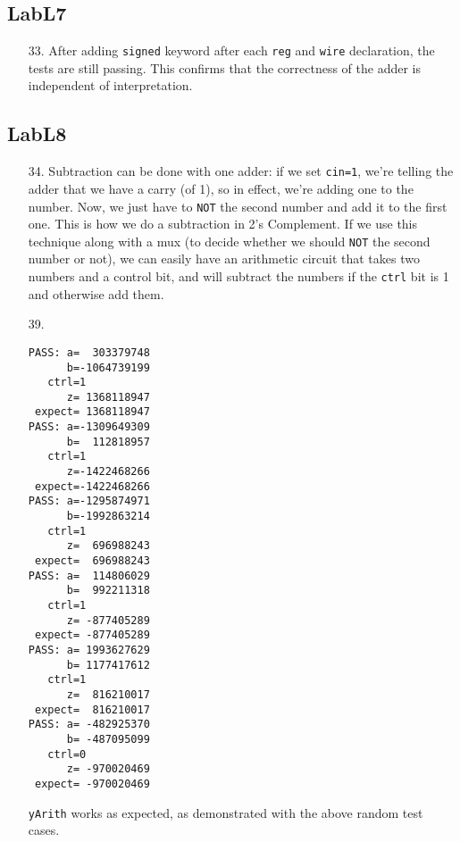 \documentclass{article}
\begin{document}
\subsection{LabL7}
\begin{enumerate}
\item[33. ] After adding \verb$signed$ keyword after each \verb$reg$ and
\verb$wire$ declaration, the tests are still passing. This confirms that
the correctness of the adder is independent of interpretation.
\end{enumerate}

\subsection{LabL8}
\begin{enumerate}
\item[34. ] Subtraction can be done with one adder: if we set \verb$cin=1$,
we're telling the adder that we have a carry (of 1), so in effect, we're adding
one to the number. Now, we just have to \verb$NOT$ the second number and add it
to the first one. This is how we do a subtraction in 2's Complement. If we use
this technique along with a mux (to decide whether we should \verb$NOT$ the
second number or not), we can easily have an arithmetic circuit that takes
two numbers and a control bit, and will subtract the numbers if the \verb$ctrl$
bit is 1 and otherwise add them.

\item[39. ]
\begin{verbatim}
PASS: a=  303379748
      b=-1064739199
   ctrl=1
      z= 1368118947
 expect= 1368118947
PASS: a=-1309649309
      b=  112818957
   ctrl=1
      z=-1422468266
 expect=-1422468266
PASS: a=-1295874971
      b=-1992863214
   ctrl=1
      z=  696988243
 expect=  696988243
PASS: a=  114806029
      b=  992211318
   ctrl=1
      z= -877405289
 expect= -877405289
PASS: a= 1993627629
      b= 1177417612
   ctrl=1
      z=  816210017
 expect=  816210017
PASS: a= -482925370
      b= -487095099
   ctrl=0
      z= -970020469
 expect= -970020469
\end{verbatim}
  \verb$yArith$ works as expected, as demonstrated with the above random test cases.
\end{enumerate}
\end{document}
